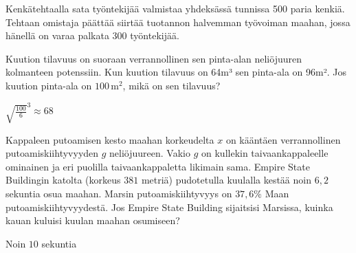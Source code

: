 \begin{tehtavasivu}
\begin{tehtava}
Kenkätehtaalla sata työntekijää valmistaa yhdeksässä tunnissa 500 paria kenkiä. Tehtaan omistaja päättää siirtää tuotannon halvemman työvoiman maahan, jossa hänellä on varaa palkata 300 työntekijää. 

\begin{alakohdat}
\end{alakohdat} 
\begin{vastaus}
\begin{alakohdat}
\end{alakohdat} 
\end{vastaus}
\end{tehtava}

\begin{tehtava}
	Kuution tilavuus on suoraan verrannollinen sen pinta-alan neliöjuuren kolmanteen potenssiin. Kun kuution tilavuus on 64m³ sen pinta-ala on 96m². Jos kuution pinta-ala on $100$\,m$^2$, mikä on sen tilavuus?
	\begin{vastaus}
		${\sqrt{\frac{100}{6}}}^{3} \approx 68$
	\end{vastaus}
\end{tehtava}

\begin{tehtava} \star
Kappaleen putoamisen kesto maahan korkeudelta $x$ on kääntäen verrannollinen putoamiskiihtyvyyden $g$ neliöjuureen. Vakio $g$ on kullekin taivaankappaleelle ominainen ja eri puolilla taivaankappaletta likimain sama. Empire State Buildingin katolta (korkeus $381$ metriä) pudotetulla kuulalla kestää noin $6,2$ sekuntia osua maahan. Marsin putoamiskiihtyvyys on $37,6\%$ Maan putoamiskiihtyvyydestä.  Jos Empire State Building sijaitsisi Marsissa, kuinka kauan kuluisi kuulan maahan osumiseen?
    \begin{vastaus}
        Noin $10$ sekuntia
    \end{vastaus}
\end{tehtava}

\end{tehtavasivu}
